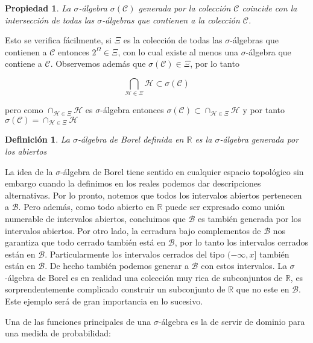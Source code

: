 \documentclass{extreport}
\makeatletter
\theoremstyle{definicion}
\newtheorem{definition}{Definición}[chapter]
\theoremstyle{propiedad}
\newtheorem{propiedad}{Propiedad}[chapter]
\theoremstyle{teorema}
\renewenvironment{proof}[1][\proofname]{\par
    \pushQED{\qed}%
    \normalfont \topsep6\p@\@plus6\p@\relax
    \trivlist
    \item\relax
            {\itshape
        #1\@addpunct{.}}\hspace\labelsep\ignorespaces
}{%
    \popQED\endtrivlist\@endpefalse
}
\makeatother
\begin{document}
\begin{propiedad}
La $\sigma$-álgebra $\sigma(\mathcal{C})$ generada por la colección $\mathcal{C}$ coincide con la intersección de todas las $\sigma$-álgebras que contienen a la colección $\mathcal{C}$.
\end{propiedad}
\begin{proof}
\par Esto se verifica fácilmente, si $\Xi$ es la colección de todas las $\sigma$-álgebras que contienen a $\mathcal{C}$ entonces $2^\Omega\in\Xi$, con lo cual existe al menos una $\sigma$-álgebra que contiene a $\mathcal{C}$. Observemos además que $\sigma(\mathcal{C})\in\Xi$, por lo tanto 

$$
\bigcap_{\mathcal{H}\in\Xi}\mathcal{H} \subset \sigma(\mathcal{C})
$$

pero como $\cap_{\mathcal{H}\in \Xi}\mathcal{H}$ es $\sigma$-álgebra entonces $\sigma(\mathcal{C})\subset\cap_{\mathcal{H}\in\Xi}\mathcal{H}$ y por tanto $\sigma(\mathcal{C})=\cap_{\mathcal{H}\in\Xi}\mathcal{H}$
\end{proof}

\begin{definition}
La $\sigma$-álgebra de Borel definida en $\mathbb{R}$ es la $\sigma$-álgebra generada por los abiertos    
\end{definition}

La idea de la $\sigma$-álgebra de Borel tiene sentido en cualquier espacio topológico sin embargo cuando la definimos en los reales podemos dar descripciones alternativas. Por lo pronto, notemos que todos los intervalos abiertos pertenecen a $\mathcal{B}.$ Pero además, como todo abierto en $\mathbb{R}$ puede ser expresado como unión numerable de intervalos abiertos, concluimos que $\mathcal{B}$ es también generada por los intervalos abiertos. Por otro lado, la cerradura bajo complementos de $\mathcal{B}$ nos garantiza que todo cerrado también está en $\mathcal{B}$, por lo tanto los intervalos cerrados están en $\mathcal{B}$. Particularmente los intervalos cerrados del tipo $(-\infty, x]$ también están en $\mathcal{B}$. De hecho también podemos generar a $\mathcal{B}$ con estos intervalos. La $\sigma$-álgebra de Borel es en realidad una colección muy rica de subconjuntos de $\mathbb{R}$, es sorprendentemente complicado construir un subconjunto de $\mathbb{R}$ que no este en $\mathcal{B}$.  Este ejemplo será de gran importancia en lo sucesivo.

Una de las funciones principales de una $\sigma$-álgebra es la de servir de dominio para una medida de probabilidad:
\end{document}
